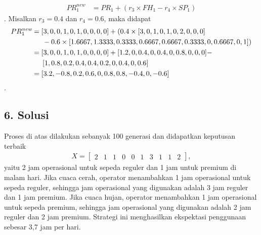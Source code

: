 \begin{contoh}
\begin{align*}
    PR_1^{\textit{new}} &= PR_1 + (r_3 \times FH_1 - r_4 \times SP_1)
\end{align*}.
Misalkan $r_3 = 0.4$ dan $r_4 = 0.6$, maka didapat
\begin{align*}
    PR_1^{\textit{new}} &= [3,0,0,1,0,1,0,0,0,0] + (0.4 \times [3,0,1,0,1,0,2,0,0,0]\\
    &\indent - 0.6 \times [1.6667,1.3333,0.3333,0.6667,0.6667,0.3333,0,0.6667,0,1])\\
    &= [3,0,0,1,0,1,0,0,0,0] + [1.2,0,0.4,0,0.4,0,0.8,0,0,0] - \\
    &\indent [1,0.8,0.2,0.4,0.4,0.2,0,0.4,0,0.6]\\
    &= [3.2,-0.8,0.2,0.6,0,0.8,0.8,-0.4,0,-0.6]
\end{align*}.

\subsection*{6. Solusi}
Proses di atas dilakukan sebanyak 100 generasi dan didapatkan keputusan terbaik
\begin{align*}
    X = \begin{bmatrix}
    2 & 1 & 1 & 0 & 0 & 1 & 3 & 1 & 1 & 2
    \end{bmatrix},
\end{align*}
yaitu 2 jam operasional untuk sepeda reguler dan 1 jam untuk premium di malam hari. Jika cuaca cerah, operator menambahkan 1 jam operasional untuk sepeda reguler, sehingga jam operasional yang digunakan adalah 3 jam reguler dan 1 jam premium. Jika cuaca hujan, operator menambahkan 1 jam operasional untuk sepeda premium, sehingga jam operasional yang digunakan adalah 2 jam reguler dan 2 jam premium. Strategi ini menghasilkan ekspektasi penggunaan sebesar 3,7 jam per hari.

\end{contoh}
